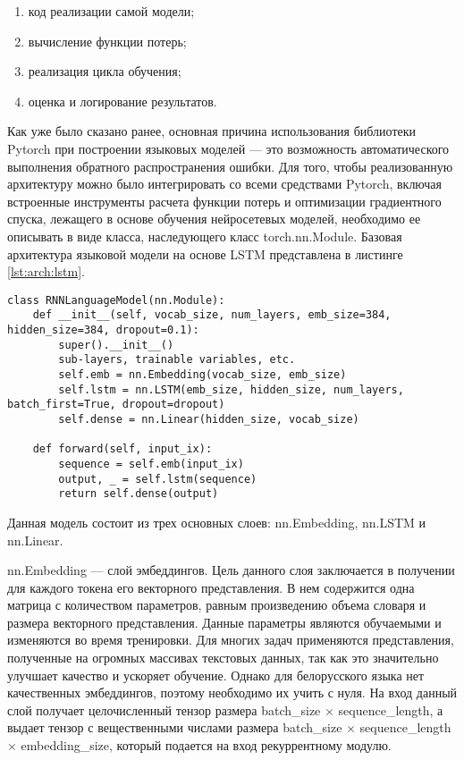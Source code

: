 \begin{enumerate}
	\item код реализации самой модели;
	\item вычисление функции потерь;
	\item реализация цикла обучения;
	\item оценка и логирование результатов.
\end{enumerate}

Как уже было сказано ранее, основная причина использования библиотеки Pytorch при построении языковых моделей --- это возможность автоматического выполнения обратного распространения ошибки. Для того, чтобы реализованную архитектуру можно было интегрировать со всеми средствами Pytorch, включая встроенные инструменты расчета функции потерь и оптимизации градиентного спуска, лежащего в основе обучения нейросетевых моделей, необходимо ее описывать в виде класса, наследующего класс torch.nn.Module. Базовая архитектура языковой модели на основе LSTM представлена в листинге \ref{lst:arch:lstm}.

\begin{lstlisting}[caption={Реализация простой языковой модели на основе LSTM}, label=lst:arch:lstm]
class RNNLanguageModel(nn.Module):
	def __init__(self, vocab_size, num_layers, emb_size=384, hidden_size=384, dropout=0.1):
		super().__init__()
		sub-layers, trainable variables, etc.
		self.emb = nn.Embedding(vocab_size, emb_size)
		self.lstm = nn.LSTM(emb_size, hidden_size, num_layers, batch_first=True, dropout=dropout)
		self.dense = nn.Linear(hidden_size, vocab_size)
	
	def forward(self, input_ix):
		sequence = self.emb(input_ix)
		output, _ = self.lstm(sequence)
		return self.dense(output)  
\end{lstlisting}

Данная модель состоит из трех основных слоев: nn.Embedding, nn.LSTM и nn.Linear.

nn.Embedding --- слой эмбеддингов. Цель данного слоя заключается в получении для каждого токена его векторного представления. В нем содержится одна матрица с количеством параметров, равным произведению объема словаря и размера векторного представления. Данные параметры являются обучаемыми и изменяются во время тренировки. Для многих задач применяются представления, полученные на огромных массивах текстовых данных, так как это значительно улучшает качество и ускоряет обучение. Однако для белорусского языка нет качественных эмбеддингов, поэтому необходимо их учить с нуля. На вход данный слой получает целочисленный тензор размера batch\_size $\times$ sequence\_length, а выдает тензор с вещественными числами размера batch\_size $\times$ sequence\_length $\times$ embedding\_size, который подается на вход рекуррентному модулю.
	

